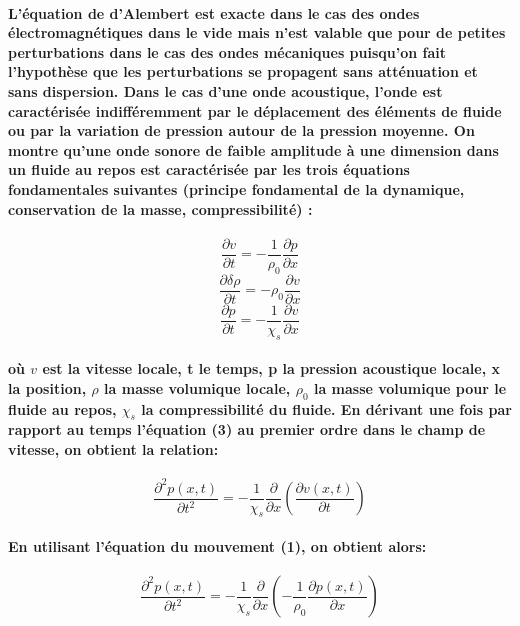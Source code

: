 \documentclass[a4paper,11pt]{article}
\begin{document}
\paragraph{\normalfont L'\'{e}quation de d'Alembert est exacte dans le cas des ondes \'{e}lectromagn\'{e}tiques dans le vide mais n'est valable que pour de petites perturbations dans le cas des ondes m\'{e}caniques puisqu'on fait l'hypoth\`{e}se que les perturbations se propagent \textbf{sans att\'{e}nuation et sans dispersion}.
Dans le cas d'une onde acoustique, l'onde est caract\'{e}ris\'{e}e \textbf{indiff\'{e}remment} par le d\'{e}placement des \'{e}l\'{e}ments de fluide ou par la variation de pression autour de la pression moyenne. On montre qu'une onde sonore de faible amplitude \`{a} une dimension dans un fluide au repos est caract\'{e}ris\'{e}e par les trois \'{e}quations fondamentales suivantes (principe fondamental de la dynamique, conservation de la masse, compressibilit\'{e}) : }
\begin{equation}
\frac{\partial v}{\partial t}=-\frac{1}{\rho_{0}}\frac{\partial p}{\partial x}
\end{equation}
\begin{equation}
\frac{\partial \delta \rho}{\partial t}=-\rho_{0}\frac{\partial v}{\partial x}
\end{equation}
\begin{equation}
\frac{\partial p}{\partial t}=-\frac{1}{\chi_{s}}\frac{\partial v}{\partial x}
\end{equation}
\paragraph{\normalfont o\`{u} $v$ est la vitesse locale, t le temps, p la pression acoustique locale, x la position, $\rho$ la masse volumique locale, $\rho_{0}$ la masse volumique pour le fluide au repos, $\chi_s$  la compressibilit\'{e} du fluide. \newline\newline
En d\'{e}rivant  une fois par rapport au temps l'\'{e}quation (3) au premier ordre dans le champ de vitesse, on obtient la relation:}
\[ \frac{\partial^{2} p(x,t)}{\partial t^{2}}= -\frac{1}{\chi_{s}}\frac{\partial}{\partial x} (\frac{\partial v(x,t)}{\partial t})\]
\paragraph{\normalfont En utilisant l'\'{e}quation du mouvement (1), on obtient alors:}
\[ \frac{\partial^{2} p(x,t)}{\partial t^{2}}= -\frac{1}{\chi_{s}}\frac{\partial}{\partial x} (-\frac{1}{\rho_0}\frac{\partial p(x,t)}{\partial x})\]
\end{document}
